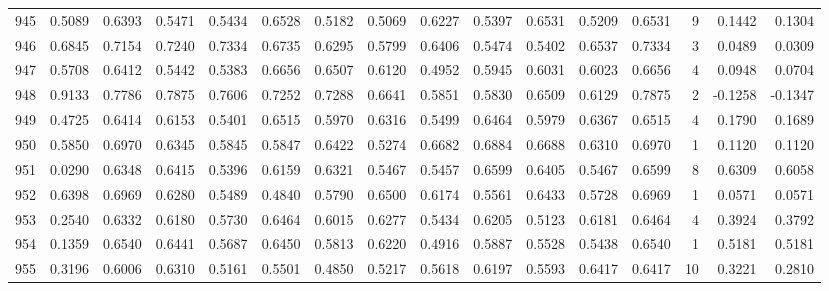 \begin{tabular}{lrrrrrrrrrrrrrrr}
945 &      0.5089 &  0.6393 &  0.5471 &  0.5434 &  0.6528 &  0.5182 &  0.5069 &  0.6227 &  0.5397 &  0.6531 &   0.5209 &     0.6531 &      9 &                    0.1442 &                     0.1304 \\
946 &      0.6845 &  0.7154 &  0.7240 &  0.7334 &  0.6735 &  0.6295 &  0.5799 &  0.6406 &  0.5474 &  0.5402 &   0.6537 &     0.7334 &      3 &                    0.0489 &                     0.0309 \\
947 &      0.5708 &  0.6412 &  0.5442 &  0.5383 &  0.6656 &  0.6507 &  0.6120 &  0.4952 &  0.5945 &  0.6031 &   0.6023 &     0.6656 &      4 &                    0.0948 &                     0.0704 \\
948 &      0.9133 &  0.7786 &  0.7875 &  0.7606 &  0.7252 &  0.7288 &  0.6641 &  0.5851 &  0.5830 &  0.6509 &   0.6129 &     0.7875 &      2 &                   -0.1258 &                    -0.1347 \\
949 &      0.4725 &  0.6414 &  0.6153 &  0.5401 &  0.6515 &  0.5970 &  0.6316 &  0.5499 &  0.6464 &  0.5979 &   0.6367 &     0.6515 &      4 &                    0.1790 &                     0.1689 \\
950 &      0.5850 &  0.6970 &  0.6345 &  0.5845 &  0.5847 &  0.6422 &  0.5274 &  0.6682 &  0.6884 &  0.6688 &   0.6310 &     0.6970 &      1 &                    0.1120 &                     0.1120 \\
951 &      0.0290 &  0.6348 &  0.6415 &  0.5396 &  0.6159 &  0.6321 &  0.5467 &  0.5457 &  0.6599 &  0.6405 &   0.5467 &     0.6599 &      8 &                    0.6309 &                     0.6058 \\
952 &      0.6398 &  0.6969 &  0.6280 &  0.5489 &  0.4840 &  0.5790 &  0.6500 &  0.6174 &  0.5561 &  0.6433 &   0.5728 &     0.6969 &      1 &                    0.0571 &                     0.0571 \\
953 &      0.2540 &  0.6332 &  0.6180 &  0.5730 &  0.6464 &  0.6015 &  0.6277 &  0.5434 &  0.6205 &  0.5123 &   0.6181 &     0.6464 &      4 &                    0.3924 &                     0.3792 \\
954 &      0.1359 &  0.6540 &  0.6441 &  0.5687 &  0.6450 &  0.5813 &  0.6220 &  0.4916 &  0.5887 &  0.5528 &   0.5438 &     0.6540 &      1 &                    0.5181 &                     0.5181 \\
955 &      0.3196 &  0.6006 &  0.6310 &  0.5161 &  0.5501 &  0.4850 &  0.5217 &  0.5618 &  0.6197 &  0.5593 &   0.6417 &     0.6417 &     10 &                    0.3221 &                     0.2810 \\

\end{tabular}
